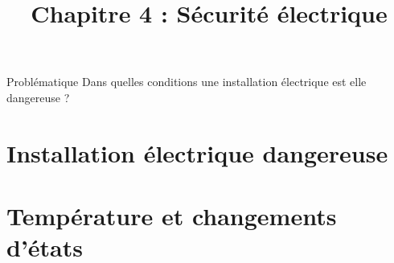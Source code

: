 \documentclass[xcolor={dvipsnames}]{beamer}
\title{Chapitre 4 : Sécurité électrique}
\begin{document}
\begin{frame}
  \titlepage 
\end{frame}


\begin{frame}
\begin{block}{Problématique}
	{\Large Dans quelles conditions une installation électrique est elle dangereuse ?}
\end{block}
\end{frame}


\section{Installation électrique dangereuse}




\begin{frame}
	
\end{frame}



\section{Température et changements d'états}

\begin{frame}
	
\end{frame}




%
%	
%
%
%	
\end{document}

